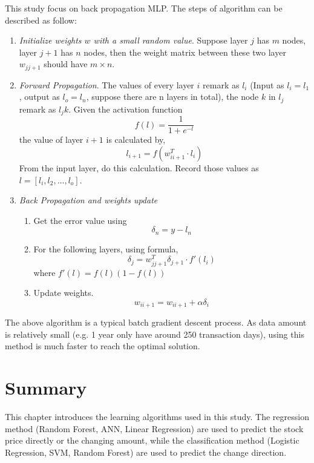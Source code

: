 This study focus on back propagation MLP. The steps of algorithm can be described as follow\cite{russell2003artificial}:
\begin{enumerate}
	\item \textit{Initialize weights $ w $ with a small random value}. Suppose layer $ j $ has $ m $ nodes, layer $j + 1$ has $ n $ nodes, then the weight matrix between these two layer $ w_{jj+1} $ should have $ m \times n $.
	\item \textit{Forward Propagation}. The values of every layer $ i $ remark as $ l_i $ (Input as $ l_i =l_1 $, output as $l_o=l_n$, suppose there are n layers in total), the node $ k $ in $ l_j $ remark as $ l_jk $. Given the activation function
	\begin{equation}
	f(l) = \frac{1}{1+e^{-l}}
	\end{equation}
	the value of layer $ i + 1 $ is calculated by,
	\begin{equation}
	l_{i+1}=f(w_{ii+1}^T\cdot l_i)
	\end{equation}
	From the input layer, do this calculation. Record those values as $ l = [l_i, l_2, \ldots, l_o] $.
	\item \textit{Back Propagation and weights update} 
	\begin{enumerate}
		\item Get the error value using
		\begin{equation}
		\delta_n = y - l_n
		\end{equation}
		
		\item For the following layers, using formula,
		\begin{equation}
		\delta_j = w_{jj+1}^T\delta_{j+1}\cdot f'(l_i)
		\end{equation}
		where $ f'(l) = f(l)(1-f(l)) $
		
		\item Update weights.
		\begin{equation}
		w_{ii+1} = w_{ii+1} + \alpha \delta_i 
		\end{equation}
	\end{enumerate}
\end{enumerate}

The above algorithm is a typical batch gradient descent process. As data amount is relatively small (e.g. 1 year only have around 250 transaction days), using this method is much faster to reach the optimal solution.

\section{Summary}
This chapter introduces the learning algorithms used in this study. The regression method (Random Forest, ANN, Linear Regression) are used to predict the stock price directly or the changing amount, while the classification method (Logistic Regression, SVM, Random Forest) are used to predict the change direction.